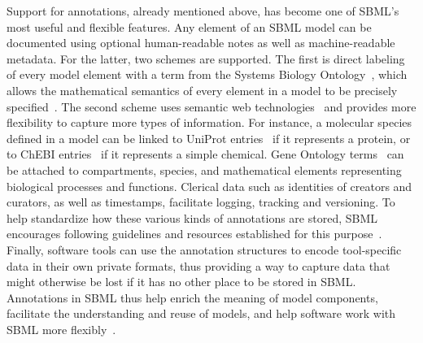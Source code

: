 \documentclass[]{draft-sbml-paper}
\begin{document}
Support for annotations, already mentioned above, has become one of SBML's most useful and flexible features.  Any element of an SBML model can be documented using optional human-readable notes as well as machine-readable metadata.  For the latter, two schemes are supported.  The first is direct labeling of every model element with a term from the Systems Biology Ontology~\citep{courtot2011controlled}, which allows the mathematical semantics of every element in a model to be precisely specified~\citep{LeNovere2006model}.  The second scheme uses semantic web technologies~\citep{lassila_resource_1999} and provides more flexibility to capture more types of information.  For instance, a molecular species defined in a model can be linked to UniProt entries~\citep{uniprot2017} if it represents a protein, or to ChEBI entries~\citep{hastings2013chebi} if it represents a simple chemical.  Gene Ontology terms~\citep{ashburner2000gene} can be attached to compartments, species, and mathematical elements representing biological processes and functions. Clerical data such as identities of creators and curators, as well as timestamps, facilitate logging, tracking and versioning.  To help standardize how these various kinds of annotations are stored, SBML encourages following guidelines and resources established for this purpose~\citep{le_novere_2005, Laibe2007miriam, krause2011chapter, Juty2012identifiers}.  Finally, software tools can use the annotation structures to encode tool-specific data in their own private formats, thus providing a way to capture data that might otherwise be lost if it has no other place to be stored in SBML.  Annotations in SBML thus help enrich the meaning of model components, facilitate the understanding and reuse of models, and help software work with SBML more flexibly~\citep{Neal2019harmonizing, Wolstencroft2015seek, krause2011chapter, Alm2015annotationbased, schulz2011retrieval, Wittig2017data, Lister2010annotation, Nguyen2016converter, Schulz2012propagating, Swainston2009libannotationsbml}.
\end{document}
